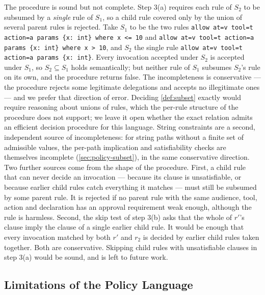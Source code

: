 \documentclass[11pt,a4paper]{article}
\begin{document}
\begin{remark}[Incompleteness]
\label{rem:incompleteness}
The procedure is sound but not complete. Step 3(a) requires each rule of
$S_2$ to be subsumed by a \emph{single} rule of $S_1$, so a child rule
covered only by the union of several parent rules is rejected. Take
$S_1$ to be the two rules
\texttt{allow at=v tool=t action=a params \{x: int\} where x <= 10} and
\texttt{allow at=v tool=t action=a params \{x: int\} where x > 10}, and
$S_2$ the single rule
\texttt{allow at=v tool=t action=a params \{x: int\}}. Every
invocation accepted under $S_2$ is accepted under $S_1$, so
$S_2 \subseteq S_1$ holds semantically; but neither rule of $S_1$
subsumes $S_2$'s rule on its own, and the procedure returns false. The
incompleteness is conservative --- the procedure rejects some legitimate
delegations and accepts no illegitimate ones --- and we prefer that
direction of error. Deciding \cref{def:subset} exactly would require
reasoning about unions of rules, which the per-rule structure of the
procedure does not support; we leave it open whether the exact relation
admits an efficient decision procedure for this language. String
constraints are a second, independent source of incompleteness: for
string paths without a finite set of admissible values, the per-path
implication and satisfiability checks are themselves incomplete
(\cref{sec:policy-subset}), in the same conservative direction. Two
further sources come from the shape of the procedure. First, a child
rule that can never decide an invocation --- because its clause is
unsatisfiable, or because earlier child rules catch everything it
matches --- must still be subsumed by some parent rule. It is rejected
if no parent rule with the same audience, tool, action and declaration
has an approval requirement weak enough, although the rule is harmless.
Second, the skip test of step 3(b) asks that the whole of $r'$'s clause
imply the clause of a single earlier child rule. It would be enough that
every invocation matched by both $r'$ and $r_2$ is decided by earlier
child rules taken together. Both are conservative. Skipping child rules
with unsatisfiable clauses in step 3(a) would be sound, and is left to
future work.
\end{remark}

\subsection{Limitations of the Policy Language}
\label{sec:policy-limitations}
\end{document}
